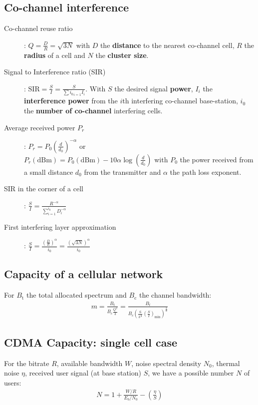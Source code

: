 \documentclass[11pt, a4paper,twocolumn]{scrartcl}
\begin{document}
\subsection{Co-channel interference}
\begin{description}
\item[Co-channel reuse ratio]: $Q = \frac{D}{R} = \sqrt{3N}$ with $D$ the \textbf{distance} to the nearest co-channel cell, $R$ the \textbf{radius} of a cell and $N$ the \textbf{cluster size}.

\item[Signal to Interference ratio (SIR)]: $\textrm{SIR} = \frac{S}{I} = \frac{S}{\sum{i_0}_{i=1}I_i}$. With $S$ the desired signal \textbf{power}, $I_i$ the \textbf{interference power} from the $i$th interfering co-channel base-station, $i_0$ the \textbf{number of co-channel} interfering cells.

\item[Average received power $P_r$]: $P_r = P_0(\frac{d}{d_0})^{-\alpha}$ or \\ 
$P_r(\textrm{dBm}) = P_0(\textrm{dBm})-10\alpha\log(\frac{d}{d_0})$ with $P_0$ the power received from a small distance $d_0$ from the transmitter and $\alpha$ the path loss exponent.
	
\item[SIR in the corner of a cell]: $\frac{S}{I} = \frac{R^{-\alpha}}{\sum^{i_0}_{i=1}D_i^{-\alpha}}$

\item[First interfering layer approximation]: $\frac{S}{I} = \frac{(\frac{D}{R})^\alpha}{i_0} = \frac{(\sqrt{3N})^\alpha}{i_0}$

\end{description}

\subsection{Capacity of a cellular network}
For $B_\textrm{t}$ the total allocated spectrum and $B_\textrm{c}$ the channel bandwidth: 
\begin{align*}
m = \frac{B_t}{B_c \frac{Q^2}{3}} = \frac{B_t}{B_c(\frac{6}{3^{\frac{\alpha}{2}}}(\frac{S}{I})_\textrm{min})^{\frac{2}{\alpha}}}
\end{align*}

\subsection{CDMA Capacity: single cell case}
For the bitrate $R$, available bandwidth $W$, noise spectral density $N_0$, thermal noise $\eta$, received user signal (at base station) $S$, we have a possible number $N$ of users:
\begin{align*}
	N = 1 + \frac{W/R}{E_b/N_0} - (\frac{\eta}{S})
\end{align*}
\end{document}

